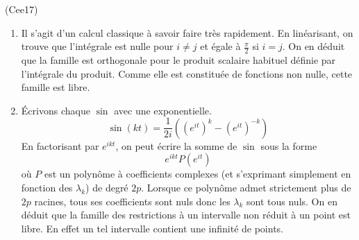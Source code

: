 \begin{tiny}(Cee17)\end{tiny}
\begin{enumerate}
 \item Il s'agit d'un calcul classique à savoir faire très rapidement. En linéarisant, on trouve que l'intégrale est nulle pour $i\neq j$ et égale à $\frac{\pi}{2}$ si $i=j$. On en déduit que la famille est orthogonale pour le produit scalaire habituel définie par l'intégrale du produit. Comme elle est constituée de fonctions non nulle, cette famille est libre.
 \item \'Ecrivons chaque $\sin$ avec une exponentielle.
\begin{displaymath}
 \sin(kt)=\frac{1}{2i}\left((e^{it})^k - (e^{it})^{-k}\right) 
\end{displaymath}
En factorisant par $e^{ikt}$, on peut écrire la somme de $\sin$ sous la forme
\begin{displaymath}
 e^{ikt}P(e^{it})
\end{displaymath}
où $P$ est un polynôme à coefficients complexes (et s'exprimant simplement en fonction des $\lambda_k$) de degré $2p$. Lorsque ce polynôme admet strictement plus de $2p$ racines, tous ses coefficients sont nuls donc les $\lambda_k$ sont tous nuls.\newline
On en déduit que la famille des restrictions à un intervalle non réduit à un point est libre. En effet un tel intervalle contient une infinité de points.
\end{enumerate}
 